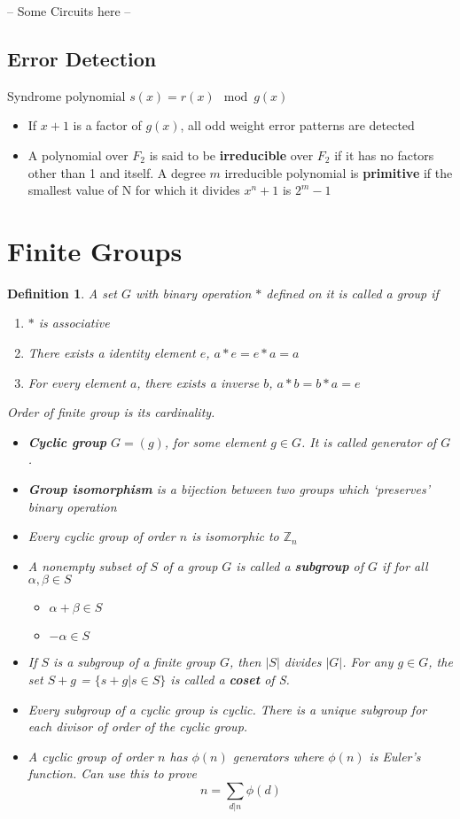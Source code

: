 \documentclass[a4paper]{article}
\theoremstyle{dotless}
\theoremstyle{dotless}
\newtheorem{defn}{Definition}[section]
\theoremstyle{remark}
\begin{document}
-- Some Circuits here --

\subsection{Error Detection}
Syndrome polynomial $s(x) = r(x)\mod{g(x)}$
\begin{itemize}
\item If $x + 1$ is a factor of $g(x)$, all odd weight error patterns are detected
\item A polynomial over $F_2$ is said to be \textbf{irreducible} over $F_2$ if it has no factors other than 1 and itself. A degree $m$ irreducible polynomial is \textbf{primitive} if the smallest value of N for which it divides $x^n + 1$ is $2^m -1$
\end{itemize}

\section{Finite Groups}
\begin{defn} 
A set $G$ with binary operation $*$ defined on it is called a group if
\begin{enumerate}
\item $*$ is associative
\item There exists a identity element $e$, $a*e = e*a = a$
\item For every element $a$, there exists a inverse $b$, $a*b = b*a = e$
\end{enumerate}
Order of finite group is its cardinality.

\begin{itemize}
\item \textbf{Cyclic group} $G = (g)$, for some element $g \in G$. It is called generator of $G$.
\item \textbf{Group isomorphism} is a bijection between two groups which `preserves' binary operation
\item Every cyclic group of order $n$ is isomorphic to $\mathbb{Z}_n$
\item A nonempty subset of $S$ of a group $G$ is called a \textbf{subgroup} of $G$ if for all $\alpha, \beta \in S$
		\begin{itemize}
		\item $\alpha + \beta \in S$
		\item $-\alpha \in S$
		\end{itemize}

\item If $S$ is a subgroup of a finite group $G$, then $|S|$ divides $|G|$. For any $g \in G$, the set $S+g$ = $\{s + g|s \in S\}$ is called a \textbf{coset} of S.
\item Every subgroup of a cyclic group is cyclic. There is a \emph{unique} subgroup for each divisor of order of the cyclic group.
\item A cyclic group of order $n$ has $\phi(n)$ generators where $\phi(n)$ is Euler's function. Can use this to prove
$$n = \sum_{d|n}\phi(d)$$
\end{itemize}
\end{defn}
\end{document}
